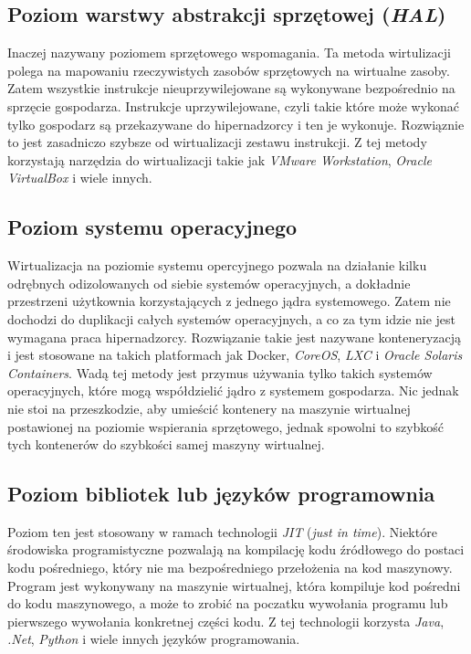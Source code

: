 \documentclass[polish, a4paper, 12pt, oneside]{book}
\begin{document}
\subsection {Poziom warstwy abstrakcji sprzętowej (\textit{HAL})}
Inaczej nazywany poziomem sprzętowego wspomagania. Ta metoda wirtulizacji polega na mapowaniu rzeczywistych zasobów sprzętowych na wirtualne zasoby. Zatem wszystkie instrukcje nieuprzywilejowane są wykonywane bezpośrednio na sprzęcie gospodarza. Instrukcje uprzywilejowane, czyli takie które może wykonać tylko gospodarz są przekazywane do hipernadzorcy i ten je wykonuje. Rozwiąznie to jest zasadniczo szybsze od wirtualizacji zestawu instrukcji. Z tej metody korzystają narzędzia do wirtualizacji takie jak \textit{VMware Workstation}\cite{vmwareworkstation}, \textit{Oracle VirtualBox}\cite{virtualbox} i wiele innych.
\subsection {Poziom systemu operacyjnego}
Wirtualizacja na poziomie systemu opercyjnego pozwala na działanie kilku odrębnych odizolowanych od siebie systemów operacyjnych, a dokładnie przestrzeni użytkownia korzystających z jednego jądra systemowego. Zatem nie dochodzi do duplikacji całych systemów operacyjnych, a co za tym idzie nie jest wymagana praca hipernadzorcy. Rozwiązanie takie jest nazywane konteneryzacją i jest stosowane na takich platformach jak Docker, \textit{CoreOS}\cite{coreos}, \textit{LXC}\cite{lxc} i \textit{Oracle Solaris Containers}\cite{solaris}. Wadą tej metody jest przymus używania tylko takich systemów operacyjnych, które mogą współdzielić jądro z systemem gospodarza. Nic jednak nie stoi na przeszkodzie, aby umieścić kontenery na maszynie wirtualnej postawionej na poziomie wspierania sprzętowego, jednak spowolni to szybkość tych kontenerów do szybkości samej maszyny wirtualnej. 
\subsection {Poziom bibliotek lub języków programownia}
Poziom ten jest stosowany w ramach technologii \textit{JIT} (\textit{just in time}). Niektóre środowiska programistyczne pozwalają na kompilację kodu źródłowego do postaci kodu pośredniego, który nie ma bezpośredniego przełożenia na kod maszynowy. Program jest wykonywany na maszynie wirtualnej, która kompiluje kod pośredni do kodu maszynowego, a może to zrobić na poczatku wywołania programu lub pierwszego wywołania konkretnej części kodu. Z tej technologii korzysta \textit{Java}\cite{java}, \textit{.Net}\cite{dotnet}, \textit{Python}\cite{python} i wiele innych języków programowania. 
\end{document}
